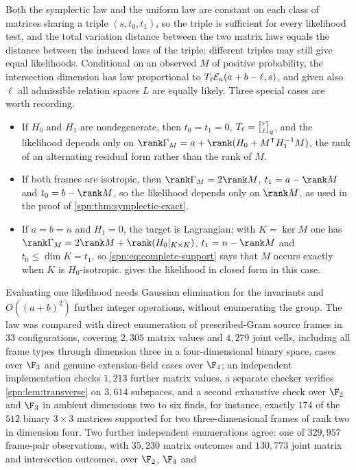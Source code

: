 Both the symplectic law and the uniform law are constant on each class of
matrices sharing a triple $(s,t_0,t_1)$, so the triple is sufficient for every
likelihood test, and the total variation distance between the two matrix laws
equals the distance between the induced laws of the triple; different triples
may still give equal likelihoods. Conditional on an observed $M$ of positive
probability, the intersection dimension has law proportional to
$T_\ell\mathcal{E}_n(a+b-\ell,s)$, and given also $\ell$ all admissible relation
spaces $L$ are equally likely. Three special cases are worth recording.
\begin{itemize}
\item If $H_0$ and $H_1$ are nondegenerate, then $t_0=t_1=0$,
$T_\ell=\spnqbin r\ell q$, and the likelihood depends only on
$\rank\Gamma_M=a+\rank(H_0+M^{\spnT}H_1^{-1}M)$, the rank of an alternating
residual form rather than the rank of $M$.
\item If both frames are isotropic, then $\rank\Gamma_M=2\rank M$,
$t_1=a-\rank M$ and $t_0=b-\rank M$, so the likelihood depends only on
$\rank M$, as used in the proof of \cref{spn:thm:symplectic-exact}.
\item If $a=b=n$ and $H_1=0$, the target is Lagrangian; with $K=\ker M$ one has
$\rank\Gamma_M=2\rank M+\rank(H_0|_{K\times K})$, $t_1=n-\rank M$ and
$t_0\le\dim K=t_1$, so \eqref{spn:eq:complete-support} says that $M$ occurs
exactly when $K$ is $H_0$-isotropic.  gives the
likelihood in closed form in this case.
\end{itemize}
Evaluating one likelihood needs Gaussian elimination for the invariants and
$O((a+b)^2)$ further integer operations, without enumerating the group. The
law was compared with direct enumeration of prescribed-Gram source frames in
$33$ configurations, covering $2{,}305$ matrix values and $4{,}279$ joint
cells, including all frame types through dimension three in a
four-dimensional binary space, cases over $\F_3$ and genuine extension-field
cases over $\F_4$; an independent implementation checks $1{,}213$ further
matrix values, a separate checker verifies \cref{spn:lem:transverse} on
$3{,}614$ subspaces, and a second exhaustive check over $\F_2$ and $\F_3$ in
ambient dimensions two to six finds, for instance, exactly $174$ of the $512$
binary $3\times3$ matrices supported for two three-dimensional frames of
rank two in dimension four. Two further independent enumerations agree: one
of $329{,}957$ frame-pair observations, with $35{,}230$ matrix outcomes and
$130{,}773$ joint matrix and intersection outcomes, over $\F_2$, $\F_3$ and
